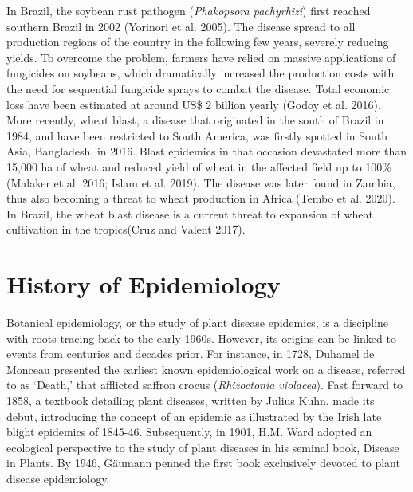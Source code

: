\documentclass[
  letterpaper,
]{book}
\begin{document}
\begin{tcolorbox}[enhanced jigsaw, coltitle=black, colbacktitle=quarto-callout-note-color!10!white, colframe=quarto-callout-note-color-frame, title=\textcolor{quarto-callout-note-color}{\faInfo}\hspace{0.5em}{Box 1: Diseases on the move}, arc=.35mm, bottomrule=.15mm, breakable, opacitybacktitle=0.6, toptitle=1mm, titlerule=0mm, bottomtitle=1mm, rightrule=.15mm, opacityback=0, leftrule=.75mm, colback=white, toprule=.15mm, left=2mm]

In Brazil, the soybean rust pathogen (\emph{Phakopsora pachyrhizi})
first reached southern Brazil in 2002 (Yorinori et al. 2005). The
disease spread to all production regions of the country in the following
few years, severely reducing yields. To overcome the problem, farmers
have relied on massive applications of fungicides on soybeans, which
dramatically increased the production costs with the need for sequential
fungicide sprays to combat the disease. Total economic loss have been
estimated at around US\$ 2 billion yearly (Godoy et al. 2016). More
recently, wheat blast, a disease that originated in the south of Brazil
in 1984, and have been restricted to South America, was firstly spotted
in South Asia, Bangladesh, in 2016. Blast epidemics in that occasion
devastated more than 15,000 ha of wheat and reduced yield of wheat in
the affected field up to 100\% (Malaker et al. 2016; Islam et al. 2019).
The disease was later found in Zambia, thus also becoming a threat to
wheat production in Africa (Tembo et al. 2020). In Brazil, the wheat
blast disease is a current threat to expansion of wheat cultivation in
the tropics(Cruz and Valent 2017).

\end{tcolorbox}

\hypertarget{history-of-epidemiology}{%
\section{History of Epidemiology}\label{history-of-epidemiology}}

Botanical epidemiology, or the study of plant disease epidemics, is a
discipline with roots tracing back to the early 1960s. However, its
origins can be linked to events from centuries and decades prior. For
instance, in 1728, Duhamel de Monceau presented the earliest known
epidemiological work on a disease, referred to as `Death,' that
afflicted saffron crocus (\emph{Rhizoctonia violacea}). Fast forward to
1858, a textbook detailing plant diseases, written by Julius Kuhn, made
its debut, introducing the concept of an epidemic as illustrated by the
Irish late blight epidemics of 1845-46. Subsequently, in 1901, H.M. Ward
adopted an ecological perspective to the study of plant diseases in his
seminal book, Disease in Plants. By 1946, Gäumann penned the first book
exclusively devoted to plant disease epidemiology.
\end{document}
